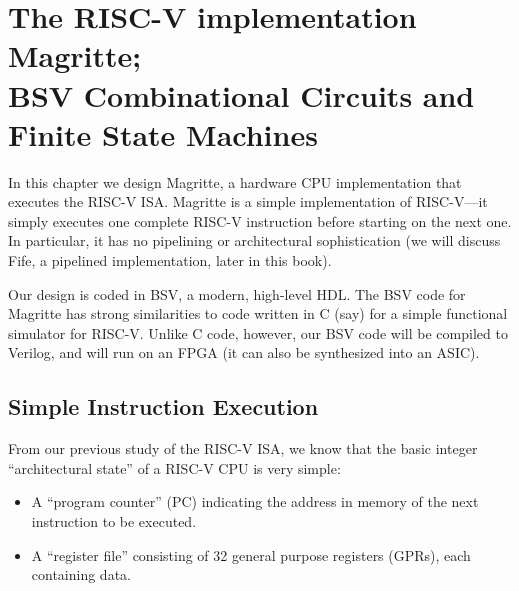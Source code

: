 

\chapter{The RISC-V implementation Magritte;\\BSV Combinational Circuits and Finite State Machines}


\setcounter{page}{1}
\renewcommand{\thepage}{\arabic{chapter}-\arabic{page}}

\label{ch_RISCV_Design_Space}


In this chapter we design Magritte, a hardware CPU implementation that
executes the RISC-V ISA.  Magritte is a simple implementation of
RISC-V---it simply executes one complete RISC-V instruction before
starting on the next one.  In particular, it has no pipelining or
architectural sophistication (we will discuss Fife, a pipelined
implementation, later in this book).

Our design is coded in BSV, a modern, high-level HDL.  The BSV code
for Magritte has strong similarities to code written in C (say) for a
simple functional simulator for RISC-V.  Unlike C code, however, our
BSV code will be compiled to Verilog, and will run on an FPGA (it can
also be synthesized into an ASIC).


\section{Simple Instruction Execution}

From our previous study of the RISC-V ISA, we know that the basic
integer ``architectural state'' of a RISC-V CPU is very simple:

\begin{itemize}

\item A ``program counter'' (PC) indicating the address in memory of
the next instruction to be executed.

\item A ``register file'' consisting of 32 general purpose registers
(GPRs), each containing data.

\end{itemize}

